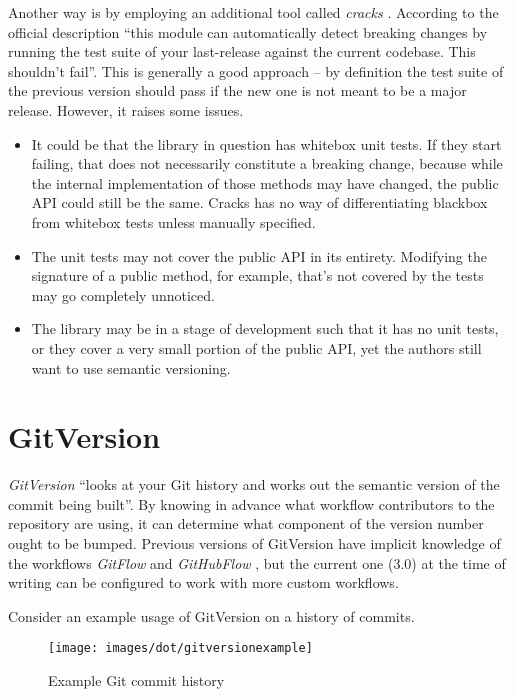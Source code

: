 \documentclass{l4proj}
\begin{document}
Another way is by employing an additional tool called
\textit{cracks} \cite{Cracks}. According to the official description
``this module can automatically detect breaking changes by running the
test suite of your last-release against the current codebase. This
shouldn't fail''. This is generally a good approach -- by definition
the test suite of the previous version should pass if the new one is
not meant to be a major release. However, it raises some issues.

\begin{itemize}
\item It could be that the library in question has whitebox unit
tests. If they start failing, that does not necessarily constitute a
breaking change, because while the internal implementation of those
methods may have changed, the public API could still be the same. Cracks has
no way of differentiating blackbox from whitebox tests unless manually
specified.
\item The unit tests may not cover the public API in its entirety.
Modifying the signature of a public method, for example, that's not
covered by the tests may go completely unnoticed.
\item The library may be in a stage of development such that it has no
unit tests, or they cover a very small portion of the public API, yet
the authors still want to use semantic versioning.
\end{itemize}

\section{GitVersion}

\textit{GitVersion} \cite{GitVersion} ``looks at your Git history and
works out the semantic version of the commit being built''.  By
knowing in advance what workflow contributors to the repository are
using, it can determine what component of the version number ought to
be bumped.
Previous versions of GitVersion have implicit knowledge of
the workflows \textit{GitFlow} \cite{GitFlow} and
\textit{GitHubFlow} \cite{GitHubFlow}, but the current one (3.0) at the
time of writing can be configured to work with more custom workflows.

Consider an example usage of GitVersion on a history of commits.

\begin{figure}[H]
\centering
\texttt{[image: images/dot/gitversionexample]}
\caption{Example Git commit history}
\end{figure}
\end{document}
